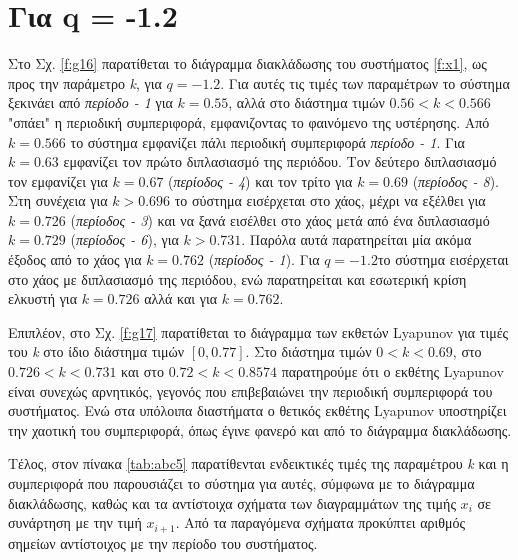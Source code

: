\section{Για q = -1.2}
Στο Σχ. \ref{f:g16} παρατίθεται το διάγραμμα διακλάδωσης του συστήματος \ref{f:x1}, ως προς την παράμετρο \emph{k}, για $q =- 1.2$. Για αυτές τις τιμές των παραμέτρων το σύστημα ξεκινάει από \emph{περίοδο - 1} για $k = 0.55$, αλλά στο διάστημα τιμών $0.56<k<0.566$ "σπάει" η περιοδική συμπεριφορά, εμφανιζοντας το φαινόμενο της υστέρησης. Από $k=0.566$ το σύστημα εμφανίζει πάλι περιοδική συμπεριφορά \emph{περίοδο - 1}. Για  $k = 0.63$ εμφανίζει τον πρώτο διπλασιασμό της περιόδου. Τον δεύτερο διπλασιασμό τον εμφανίζει για $k=0.67$ (\emph{περίοδος - 4}) και τον τρίτο για $k=0.69$ (\emph{περίοδος -   8}). Στη συνέχεια για $k>0.696$ το σύστημα εισέρχεται στο χάος, μέχρι να εξέλθει για $k=0.726$  (\emph{περίοδος - 3}) και να ξανά εισέλθει στο χάος μετά από ένα διπλασιασμό $k=0.729$ (\emph{περίοδος - 6}), για $k>0.731$. Παρόλα αυτά παρατηρείται μία ακόμα έξοδος από το χάος για $k=0.762$ (\emph{περίοδος -   1}). Για $q=-1.2$το σύστημα εισέρχεται στο χάος με διπλασιασμό της περιόδου, ενώ παρατηρείται και εσωτερική κρίση ελκυστή για $k=0.726$ αλλά και για $k=0.762$.

Επιπλέον, στο Σχ. \ref{f:g17} παρατίθεται το διάγραμμα των εκθετών Lyapunov για τιμές του \emph{k} στο ίδιο διάστημα τιμών $[0, 0.77]$. Στο διάστημα τιμών  $0<k<0.69$, στο $0.726<k<0.731$ και στο $0.72<k<0.8574$ παρατηρούμε ότι ο εκθέτης Lyapunov είναι συνεχώς αρνητικός, γεγονός που επιβεβαιώνει την περιοδική συμπεριφορά του συστήματος. Ενώ στα υπόλοιπα διαστήματα ο θετικός εκθέτης Lyapunov υποστηρίζει την χαοτική του συμπεριφορά, όπως έγινε φανερό και από το διάγραμμα διακλάδωσης.

Τέλος, στον πίνακα \ref{tab:abc5} παρατίθενται ενδεικτικές τιμές της παραμέτρου \emph{k} και η συμπεριφορά που παρουσιάζει το σύστημα για αυτές, σύμφωνα με το διάγραμμα διακλάδωσης, καθώς και τα αντίστοιχα σχήματα των διαγραμμάτων της τιμής \(x_i\) σε συνάρτηση με την τιμή \(x_{i+1}\). Από τα παραγόμενα σχήματα προκύπτει αριθμός σημείων αντίστοιχος με την περίοδο του συστήματος.\\\\

